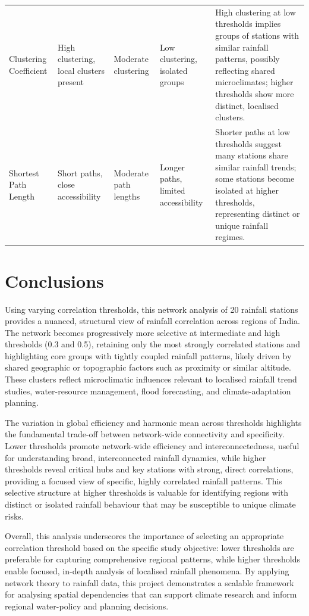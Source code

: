 \documentclass[11pt]{article}
\begin{document}
\begin{table}[H]
\begin{tabular}{@{}p{2.3cm}p{2.3cm}p{2.3cm}p{2.3cm}p{4.0cm}@{}}
    \addlinespace
    Clustering Coefficient & High clustering, local clusters present & Moderate clustering & Low clustering, isolated groups &
    High clustering at low thresholds implies groups of stations with similar rainfall patterns, possibly reflecting shared microclimates; higher thresholds show more distinct, localised clusters. \\
    \addlinespace
    Shortest Path Length & Short paths, close accessibility & Moderate path lengths & Longer paths, limited accessibility &
    Shorter paths at low thresholds suggest many stations share similar rainfall trends; some stations become isolated at higher thresholds, representing distinct or unique rainfall regimes. \\
    \bottomrule
  \end{tabular}
\end{table}

\section{Conclusions}
Using varying correlation thresholds, this network analysis of 20 rainfall stations provides a
nuanced, structural view of rainfall correlation across regions of India. The network becomes
progressively more selective at intermediate and high thresholds (0.3 and 0.5), retaining only the
most strongly correlated stations and highlighting core groups with tightly coupled rainfall
patterns, likely driven by shared geographic or topographic factors such as proximity or similar
altitude. These clusters reflect microclimatic influences relevant to localised rainfall trend
studies, water-resource management, flood forecasting, and climate-adaptation planning.

The variation in global efficiency and harmonic mean across thresholds highlights the fundamental
trade-off between network-wide connectivity and specificity. Lower thresholds promote network-wide
efficiency and interconnectedness, useful for understanding broad, interconnected rainfall dynamics,
while higher thresholds reveal critical hubs and key stations with strong, direct correlations,
providing a focused view of specific, highly correlated rainfall patterns. This selective structure at
higher thresholds is valuable for identifying regions with distinct or isolated rainfall behaviour
that may be susceptible to unique climate risks.

Overall, this analysis underscores the importance of selecting an appropriate correlation threshold
based on the specific study objective: lower thresholds are preferable for capturing comprehensive
regional patterns, while higher thresholds enable focused, in-depth analysis of localised rainfall
phenomena. By applying network theory to rainfall data, this project demonstrates a scalable framework
for analysing spatial dependencies that can support climate research and inform regional water-policy
and planning decisions.
\end{document}

